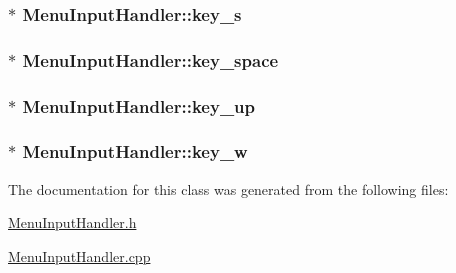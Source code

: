 \subsubsection[{key\+\_\+s}]{$\ast$ Menu\+Input\+Handler\+::key\+\_\+s\hspace{0.3cm}{\ttfamily [private]}}\label{class_menu_input_handler_ad3ceb5cae1d9f9a3856bf98e979255f8}
\hypertarget{class_menu_input_handler_ae824111d212fbb054d1bed494bb1e4db}{}
\subsubsection[{key\+\_\+space}]{$\ast$ Menu\+Input\+Handler\+::key\+\_\+space\hspace{0.3cm}{\ttfamily [private]}}\label{class_menu_input_handler_ae824111d212fbb054d1bed494bb1e4db}
\hypertarget{class_menu_input_handler_a9a87e9f15ddde05aa256bc387377df23}{}
\subsubsection[{key\+\_\+up}]{$\ast$ Menu\+Input\+Handler\+::key\+\_\+up\hspace{0.3cm}{\ttfamily [private]}}\label{class_menu_input_handler_a9a87e9f15ddde05aa256bc387377df23}
\hypertarget{class_menu_input_handler_a895525d46e8ddbdda01a2d66dc57d387}{}
\subsubsection[{key\+\_\+w}]{$\ast$ Menu\+Input\+Handler\+::key\+\_\+w\hspace{0.3cm}{\ttfamily [private]}}\label{class_menu_input_handler_a895525d46e8ddbdda01a2d66dc57d387}


The documentation for this class was generated from the following files\+:\begin{DoxyCompactItemize}
\item 
\hyperlink{_menu_input_handler_8h}{Menu\+Input\+Handler.\+h}\item 
\hyperlink{_menu_input_handler_8cpp}{Menu\+Input\+Handler.\+cpp}\end{DoxyCompactItemize}
